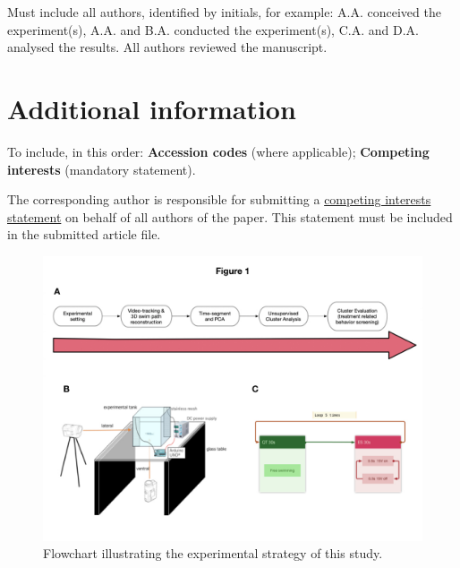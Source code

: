 \documentclass[fleqn,10pt]{wlscirep}
\begin{document}
Must include all authors, identified by initials, for example:
A.A. conceived the experiment(s),  A.A. and B.A. conducted the experiment(s), C.A. and D.A. analysed the results.  All authors reviewed the manuscript. 

\section*{Additional information}

To include, in this order: \textbf{Accession codes} (where applicable); \textbf{Competing interests} (mandatory statement). 

The corresponding author is responsible for submitting a \href{http://www.nature.com/srep/policies/index.html#competing}{competing interests statement} on behalf of all authors of the paper. This statement must be included in the submitted article file.

\begin{figure}[ht]
\centering
\includegraphics[width=\linewidth]{Figure_1.jpeg}
\caption{Flowchart illustrating the experimental strategy of this study.}
\label{fig:flow}
\end{figure}
\end{document}
